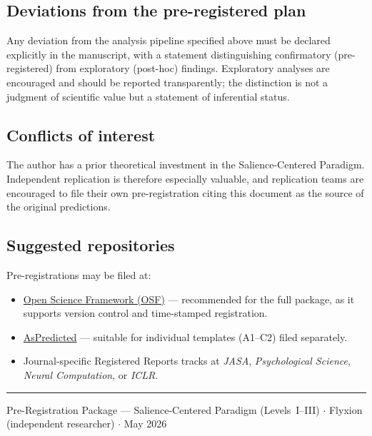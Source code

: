 \documentclass[11pt, a4paper]{article}
\newcommand{\scp}{Salience-Centered Paradigm}
\begin{document}
\subsection{Deviations from the pre-registered plan}

Any deviation from the analysis pipeline specified above must be declared
explicitly in the manuscript, with a statement distinguishing confirmatory
(pre-registered) from exploratory (post-hoc) findings.  Exploratory analyses
are encouraged and should be reported transparently; the distinction is not a
judgment of scientific value but a statement of inferential status.

\subsection{Conflicts of interest}

The author has a prior theoretical investment in the \scp{}.  Independent
replication is therefore especially valuable, and replication teams are encouraged
to file their own pre-registration citing this document as the source of the
original predictions.

\subsection{Suggested repositories}

Pre-registrations may be filed at:
\begin{itemize}
  \item \href{https://osf.io}{Open Science Framework (OSF)} — recommended for the
    full package, as it supports version control and time-stamped registration.
  \item \href{https://aspredicted.org}{AsPredicted} — suitable for individual
    templates (A1–C2) filed separately.
  \item Journal-specific Registered Reports tracks at \emph{JASA},
    \emph{Psychological Science}, \emph{Neural Computation}, or \emph{ICLR}.
\end{itemize}

\vfill
{\color{navy}\rule{\linewidth}{0.8pt}}
{\centering\small\color{slategray}
Pre-Registration Package — Salience-Centered Paradigm (Levels~I–III)
\quad $\cdot$ \quad Flyxion (independent researcher)
\quad $\cdot$ \quad May 2026\par}
\end{document}
